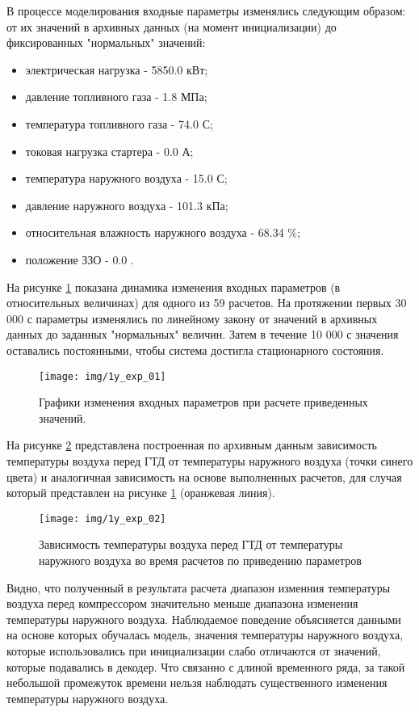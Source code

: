 \documentclass[12pt,a4paper]{article}
\begin{document}
В процессе моделирования входные параметры изменялись следующим образом: от их значений в архивных данных (на момент инициализации) до фиксированных "нормальных" значений:

\begin{itemize}
	\item электрическая нагрузка - 5850.0 кВт;
	\item давление топливного газа - 1.8 МПа;
	\item температура топливного газа - 74.0 \degree С;
	\item токовая нагрузка стартера - 0.0 А;
	\item температура наружного воздуха - 15.0 \degree С;
	\item давление наружного воздуха - 101.3 кПа;
	\item относительная влажность наружного воздуха - 68.34 \%;
	\item положение ЗЗО - 0.0 \degree.
\end{itemize}

На рисунке \ref{fig:1y_exp_01} показана динамика изменения входных параметров (в относительных величинах) для одного из 59 расчетов. На протяжении первых 30 000 с параметры изменялись по линейному закону от значений в архивных данных до заданных "нормальных" величин. Затем в течение 10 000 с значения оставались постоянными, чтобы система достигла стационарного состояния.

\begin{figure}[htbp]
	\centering\texttt{[image: img/1y\_exp\_01]}
	\caption{Графики изменения входных параметров при расчете приведенных значений.}
	\label{fig:1y_exp_01}
\end{figure}


На рисунке \ref{fig:1y_exp_02} представлена построенная по архивным данным зависимость температуры воздуха перед ГТД от температуры наружного воздуха (точки синего цвета) и аналогичная зависимость на основе выполненных расчетов, для случая который представлен на рисунке \ref{fig:1y_exp_01} (оранжевая линия).

\begin{figure}[htbp]
	\centering\texttt{[image: img/1y\_exp\_02]}
	\caption{Зависимость температуры воздуха перед ГТД от температуры наружного воздуха во время расчетов по приведению параметров}
	\label{fig:1y_exp_02}
\end{figure}


Видно, что полученный в результата расчета диапазон изменния температуры воздуха перед компрессором значительно меньше диапазона изменения температуры наружного воздуха. Наблюдаемое поведение объясняется данными на основе которых обучалась модель, значения температуры наружного воздуха, которые использовались при инициализации слабо отличаются от значений, которые подавались в декодер. Что связанно с длиной временного ряда, за такой небольшой промежуток времени нельзя наблюдать существенного изменения температуры наружного воздуха.
\end{document}
